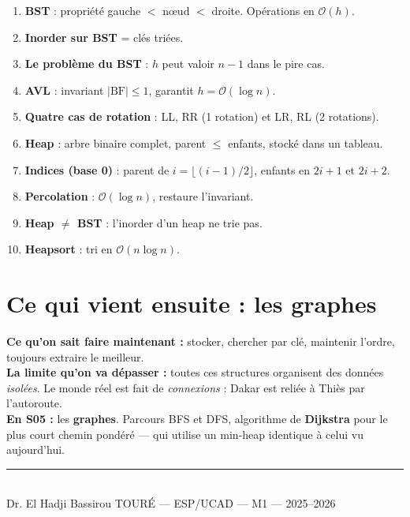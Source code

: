 \documentclass[11pt,a4paper]{article}
\newcommand{\bigO}{\mathcal{O}}
\begin{document}
\begin{retenirbox}[Synthèse S04]
\begin{enumerate}
    \item \textbf{BST} : propriété gauche $<$ nœud $<$ droite. Opérations en $\bigO(h)$.
    \item \textbf{Inorder sur BST} = clés triées.
    \item \textbf{Le problème du BST} : $h$ peut valoir $n - 1$ dans le pire cas.
    \item \textbf{AVL} : invariant $|\text{BF}| \leq 1$, garantit $h = \bigO(\log n)$.
    \item \textbf{Quatre cas de rotation} : LL, RR (1 rotation) et LR, RL (2 rotations).
    \item \textbf{Heap} : arbre binaire complet, parent $\leq$ enfants, stocké dans un tableau.
    \item \textbf{Indices (base 0)} : parent de $i = \lfloor (i-1)/2 \rfloor$, enfants en $2i+1$ et $2i+2$.
    \item \textbf{Percolation} : $\bigO(\log n)$, restaure l'invariant.
    \item \textbf{Heap $\neq$ BST} : l'inorder d'un heap ne trie pas.
    \item \textbf{Heapsort} : tri en $\bigO(n \log n)$.
\end{enumerate}
\end{retenirbox}

\section*{Ce qui vient ensuite : les graphes}

\begin{prereqbox}
\textbf{Ce qu'on sait faire maintenant :} stocker, chercher par clé, maintenir l'ordre, toujours extraire le meilleur.\\[4pt]
\textbf{La limite qu'on va dépasser :} toutes ces structures organisent des données \emph{isolées}. Le monde réel est fait de \emph{connexions} : Dakar est reliée à Thiès par l'autoroute.\\[4pt]
\textbf{En S05 :} les \textbf{graphes}. Parcours BFS et DFS, algorithme de \textbf{Dijkstra} pour le plus court chemin pondéré --- qui utilise un min-heap identique à celui vu aujourd'hui.
\end{prereqbox}

\vfill
\begin{center}
\rule{0.6\textwidth}{0.4pt}\\[6pt]
{\small Dr. El Hadji Bassirou TOURÉ --- ESP/UCAD --- M1 --- 2025--2026}
\end{center}
\end{document}
